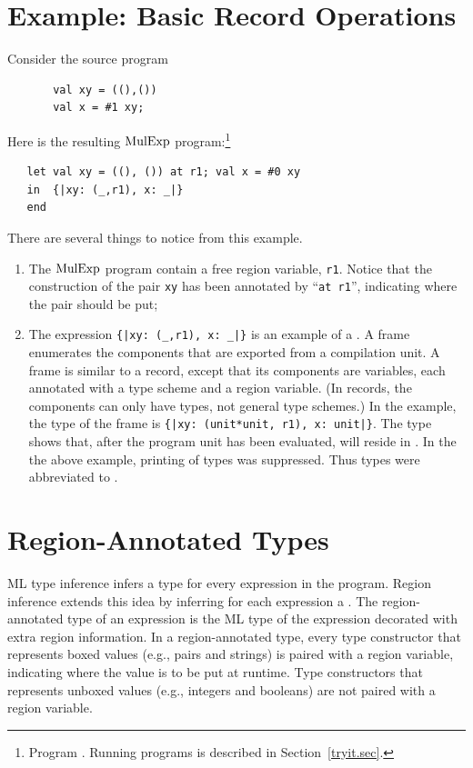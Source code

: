 \documentclass[12pt]{book}
\begin{document}
\section{Example: Basic Record Operations}
\label{proj.ex}
Consider the source program
\begin{verbatim}
       val xy = ((),()) 
       val x = #1 xy;
\end{verbatim}
Here is the resulting $\hbox{\rm MulExp}$ program:\footnote{Program
  . Running programs is described in
  Section~\ref{tryit.sec}.}
\begin{verbatim}
   let val xy = ((), ()) at r1; val x = #0 xy
   in  {|xy: (_,r1), x: _|}
   end 
\end{verbatim}
There are several things to notice from this example. 
\begin{enumerate}
\item The $\hbox{\rm MulExp}$ program contain a free region variable,
      {\tt r1}. Notice that the construction of the
      pair {\tt xy} has been annotated by ``{\tt at r1}'', indicating
      where the pair should be put;
\item The expression \verb+{|xy: (_,r1), x: _|}+ is
      an example of a . A frame enumerates
      the components that are exported from a compilation unit.
      A frame is similar to a record, except that its components
      are variables, each annotated with a type scheme and
      a region variable. (In records, the components can only
      have types, not general type schemes.) In the example,
      the type of the frame is \verb+{|xy: (unit*unit, r1), x: unit|}+. 
      The type shows that, after the program unit has been
      evaluated,   will reside in .
      In the the above example, printing of types was suppressed. Thus
      types were abbreviated to \boxml{\_}.
\end{enumerate}
\section{Region-Annotated Types}
\label{reganntypes.sec}
ML type inference infers a type for every expression in the program.
Region inference extends this idea by inferring for each expression a
. The
region-annotated type of an expression is the ML type of the
expression decorated with extra region information.  In a
region-annotated type, every type constructor that represents boxed
values (e.g., pairs and strings) is paired with a region variable,
indicating where the value is to be put at runtime. Type constructors
that represents unboxed values (e.g., integers and booleans) are not
paired with a region variable.
\end{document}
